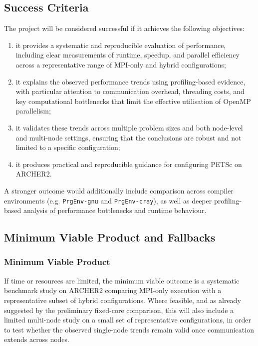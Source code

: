 \documentclass{article}
\begin{document}
\subsection{Success Criteria}

The project will be considered successful if it achieves the following objectives:

\begin{enumerate}
    \item it provides a systematic and reproducible evaluation of performance, including clear measurements of runtime, speedup, and parallel efficiency across a representative range of MPI-only and hybrid configurations;

    \item it explains the observed performance trends using profiling-based evidence, with particular attention to communication overhead, threading costs, and key computational bottlenecks that limit the effective utilisation of OpenMP parallelism;

    \item it validates these trends across multiple problem sizes and both node-level and multi-node settings, ensuring that the conclusions are robust and not limited to a specific configuration;

    \item it produces practical and reproducible guidance for configuring PETSc on ARCHER2.
\end{enumerate}

A stronger outcome would additionally include comparison across compiler environments (e.g. \texttt{PrgEnv-gnu} and \texttt{PrgEnv-cray}), as well as deeper profiling-based analysis of performance bottlenecks and runtime behaviour.


\subsection{Minimum Viable Product and Fallbacks}

\subsubsection{Minimum Viable Product}

If time or resources are limited, the minimum viable outcome is a systematic benchmark study on ARCHER2 comparing MPI-only execution with a representative subset of hybrid configurations. 
Where feasible, and as already suggested by the preliminary fixed-core comparison, this will also include a limited multi-node study on a small set of representative configurations, in order to test whether the observed single-node trends remain valid once communication extends across nodes.
\end{document}
